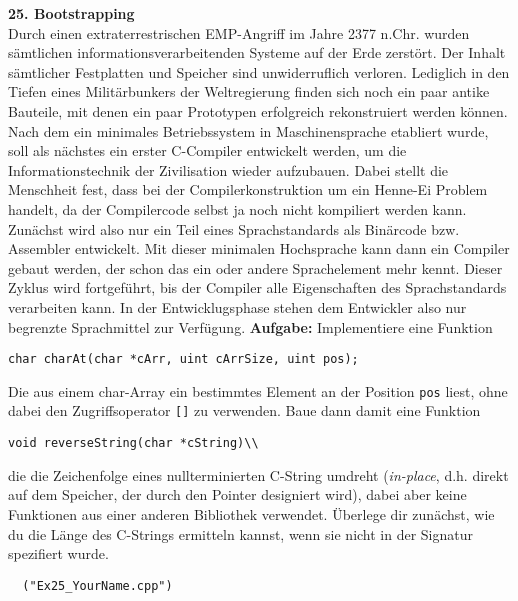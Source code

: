 \documentclass[paper=A4, pagesize, DIV=calc, smallheadings,
fontsize=11pt, expansion=false]{scrreprt}
\begin{document}
\textbf{25. Bootstrapping}\\
Durch einen extraterrestrischen EMP-Angriff im Jahre 2377 n.Chr. wurden sämtlichen informationsverarbeitenden Systeme auf der Erde zerstört. Der Inhalt sämtlicher Festplatten und Speicher sind unwiderruflich verloren.
Lediglich in den Tiefen eines Militärbunkers der Weltregierung finden sich noch ein paar antike Bauteile, mit denen ein paar Prototypen erfolgreich rekonstruiert werden können.
Nach dem ein minimales Betriebssystem in Maschinensprache etabliert wurde, soll als nächstes ein erster C-Compiler entwickelt werden, um die Informationstechnik der Zivilisation wieder aufzubauen. Dabei stellt die Menschheit fest, dass bei der Compilerkonstruktion um ein Henne-Ei Problem handelt, da der Compilercode selbst ja noch nicht kompiliert werden kann.\\
Zunächst wird also nur ein  Teil eines Sprachstandards als Binärcode bzw. Assembler entwickelt. Mit dieser minimalen Hochsprache kann dann ein Compiler gebaut werden, der schon das ein oder andere Sprachelement mehr kennt. Dieser Zyklus wird fortgeführt, bis der Compiler alle Eigenschaften des Sprachstandards verarbeiten kann.
In der Entwicklugsphase stehen dem Entwickler also nur begrenzte Sprachmittel zur Verfügung.
\textbf{Aufgabe:} Implementiere eine Funktion 
\begin{verbatim}
char charAt(char *cArr, uint cArrSize, uint pos);
\end{verbatim}
Die aus einem char-Array ein bestimmtes Element an der Position \texttt{pos} liest, ohne dabei den Zugriffsoperator \texttt{[]} zu verwenden.
Baue dann damit eine Funktion
\begin{verbatim}
void reverseString(char *cString)\\
\end{verbatim}
die die Zeichenfolge eines nullterminierten C-String umdreht (\emph{in-place}, d.h. direkt auf dem Speicher, der durch den Pointer designiert wird), dabei aber keine Funktionen aus einer anderen Bibliothek verwendet.
 Überlege dir zunächst, wie du die Länge des C-Strings ermitteln kannst, wenn sie nicht in der Signatur spezifiert wurde.
\begin{verbatim}
  ("Ex25_YourName.cpp")
\end{verbatim}
\end{document}
